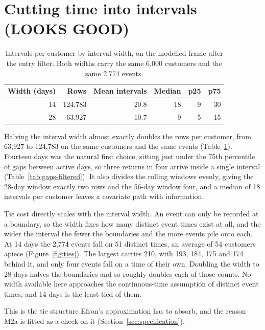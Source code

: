 \section{Cutting time into intervals (LOOKS GOOD)}
\label{sec:res-interval-width}
\label{sec:res-ties}
 
\begin{table}[htbp]
\centering
\small
\begin{tabular}{@{}rrrrrr@{}}
\toprule
Width (days) & Rows & Mean intervals & Median & p25 & p75 \\
\midrule
14 & 124{,}783 & 20.8 & 18 & 9 & 30 \\
28 &  63{,}927 & 10.7 &  9 & 5 & 15 \\
\bottomrule
\end{tabular}
\caption{Intervals per customer by interval width, on the modelled frame after the entry filter. Both widths carry the same 6{,}000 customers and the same 2{,}774 events.}
\label{tab:interval-width}
\end{table}
 
Halving the interval width almost exactly doubles the rows per customer, from 63{,}927 to 124{,}783 on the same customers and the same events (Table~\ref{tab:interval-width}). Fourteen days was the natural first choice, sitting just under the 75th percentile of gaps between active days, so three returns in four arrive inside a single interval (Table~\ref{tab:gaps-filtered}). It also divides the rolling windows evenly, giving the 28-day window exactly two rows and the 56-day window four, and a median of 18 intervals per customer leaves a covariate path with information.
 
Tie cost directly scales with the interval width. An event can only be recorded at a boundary, so the width fixes how many distinct event times exist at all, and the wider the interval the fewer the boundaries and the more events pile onto each. At 14 days the 2{,}774 events fall on 51 distinct times, an average of 54 customers apiece (Figure~\ref{fig:ties}). The largest carries 210, with 193, 184, 175 and 174 behind it, and only four events fall on a time of their own. Doubling the width to 28 days halves the boundaries and so roughly doubles each of those counts. No width available here approaches the continuous-time assumption of distinct event times, and 14 days is the least tied of them.

This is the tie structure Efron's approximation has to absorb, and the reason M2a is fitted as a check on it (Section~\ref{sec:specification}).

